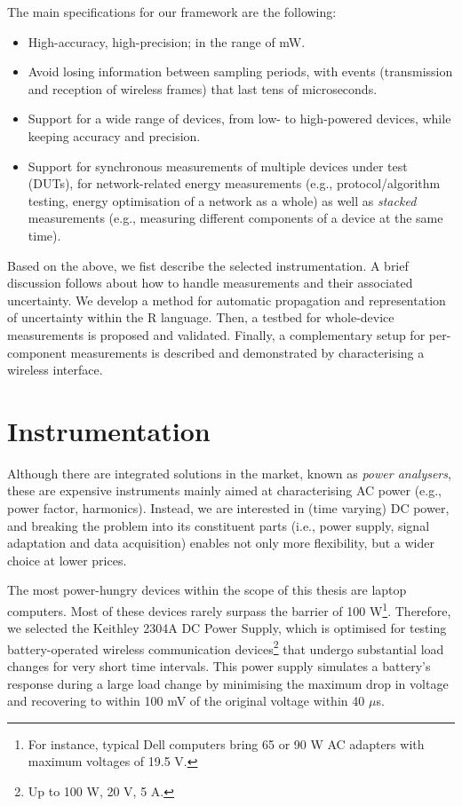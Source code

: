 \documentclass[twoside,nohyper]{tufte-book}
\providecommand{\tightlist}{%
  \setlength{\itemsep}{0pt}\setlength{\parskip}{0pt}}
\theoremstyle{definition}
\theoremstyle{definition}
\theoremstyle{definition}
\theoremstyle{remark}
\begin{document}
The main specifications for our framework are the following:

\begin{itemize}
\tightlist
\item
  High-accuracy, high-precision; in the range of mW.
\item
  Avoid losing information between sampling periods, with events
  (transmission and reception of wireless frames) that last tens of
  microseconds.
\item
  Support for a wide range of devices, from low- to high-powered
  devices, while keeping accuracy and precision.
\item
  Support for synchronous measurements of multiple devices under test
  (DUTs), for network-related energy measurements (e.g.,
  protocol/algorithm testing, energy optimisation of a network as a
  whole) as well as \emph{stacked} measurements (e.g., measuring
  different components of a device at the same time).
\end{itemize}

Based on the above, we fist describe the selected instrumentation. A
brief discussion follows about how to handle measurements and their
associated uncertainty. We develop a method for automatic propagation
and representation of uncertainty within the R
language\cite[0pt]{R-base}.
Then, a testbed for whole-device measurements is proposed and validated.
Finally, a complementary setup for per-component measurements is
described and demonstrated by characterising a wireless interface.

\hypertarget{instrumentation}{%
\section{Instrumentation}\label{instrumentation}}

Although there are integrated solutions in the market, known as
\emph{power analysers}, these are expensive instruments mainly aimed at
characterising AC power (e.g., power factor, harmonics). Instead, we are
interested in (time varying) DC power, and breaking the problem into its
constituent parts (i.e., power supply, signal adaptation and data
acquisition) enables not only more flexibility, but a wider choice at
lower prices.

The most power-hungry devices within the scope of this thesis are laptop
computers. Most of these devices rarely surpass the barrier of 100
W\footnote{For instance, typical Dell computers bring 65 or 90 W AC
  adapters with maximum voltages of 19.5 V.}. Therefore, we selected the
Keithley 2304A DC Power Supply, which is optimised for testing
battery-operated wireless communication devices\footnote{Up to 100 W, 20
  V, 5 A.} that undergo substantial load changes for very short time
intervals. This power supply simulates a battery's response during a
large load change by minimising the maximum drop in voltage and
recovering to within 100 mV of the original voltage within 40 \(\mu\)s.
\end{document}
